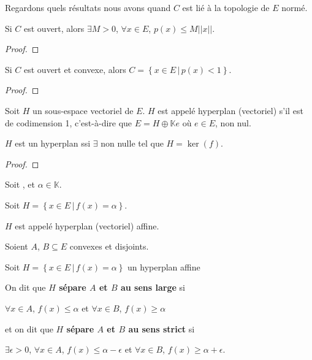 Regardons quels résultats nous avons quand $C$ est lié à la topologie de $E$
normé.

\begin{proposition}
	Si $C$ est ouvert, alors $\exists M > 0$, $\forall x \in E$, $p(x) \leq M
	||x||$.
\end{proposition}

\begin{proof}
	
\end{proof}

\begin{proposition}
	Si $C$ est ouvert et convexe, alors $C = \left\{x \in E \, | \, p(x) <
	1\right\}$.
\end{proposition}

\begin{proof}
	
\end{proof}

\begin{definition} [Hyperplan]
	Soit $H$ un sous-espace vectoriel de $E$. $H$ est appelé hyperplan
	(vectoriel) s'il est de codimension 1, c'est-à-dire que $E = H\oplus
	\mathbb{K}e$ où $e \in E$, non nul.
\end{definition}

\begin{proposition}
	$H$ est un hyperplan ssi $\exists$  non nulle
	tel que $H = \ker(f)$.
\end{proposition}

\begin{proof}
	
\end{proof}

\begin{definition} 
	Soit , et $\alpha \in \mathbb{K}$.
	
	Soit $H = \left\{ x \in E \, | \, f(x) = \alpha \right\}$.

	$H$ est appelé hyperplan (vectoriel) affine.
\end{definition}


\begin{definition}
	Soient $A$, $B \subseteq E$ convexes et disjoints.
	
	Soit $H = \left\{ x \in E \, | \, f(x) = \alpha\right\}$ un hyperplan affine

	On dit que \textbf{$H$ sépare $A$ et $B$ au sens large} si

	$\forall x \in A$, $f(x) \leq \alpha$ et $\forall x \in B$, $f(x) \geq
	\alpha$

	et on dit que \textbf{$H$ sépare $A$ et $B$ au sens strict} si

	$\exists \epsilon > 0$, $\forall x \in A$, $f(x) \leq \alpha -
	\epsilon$ et $\forall x \in B$, $f(x) \geq \alpha + \epsilon$.

\end{definition}


